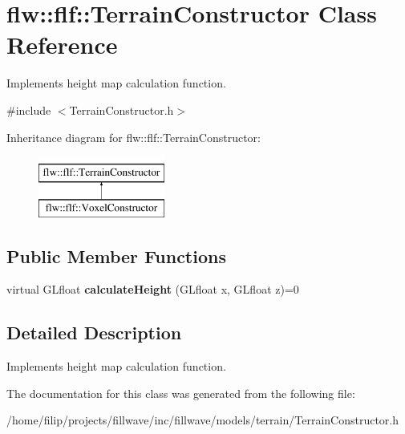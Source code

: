 \hypertarget{classflw_1_1flf_1_1TerrainConstructor}{}\section{flw\+:\+:flf\+:\+:Terrain\+Constructor Class Reference}
\label{classflw_1_1flf_1_1TerrainConstructor}


Implements height map calculation function.  




{\ttfamily \#include $<$Terrain\+Constructor.\+h$>$}

Inheritance diagram for flw\+:\+:flf\+:\+:Terrain\+Constructor\+:\begin{figure}[H]
\begin{center}
\leavevmode
\includegraphics[height=2.000000cm]{classflw_1_1flf_1_1TerrainConstructor}
\end{center}
\end{figure}
\subsection*{Public Member Functions}
\begin{DoxyCompactItemize}
\item 
\mbox{\label{classflw_1_1flf_1_1TerrainConstructor_aea7e64bfd2697ebd8f358efa82e444e3}} 
virtual G\+Lfloat {\bfseries calculate\+Height} (G\+Lfloat x, G\+Lfloat z)=0
\end{DoxyCompactItemize}


\subsection{Detailed Description}
Implements height map calculation function. 

The documentation for this class was generated from the following file\+:\begin{DoxyCompactItemize}
\item 
/home/filip/projects/fillwave/inc/fillwave/models/terrain/Terrain\+Constructor.\+h\end{DoxyCompactItemize}
